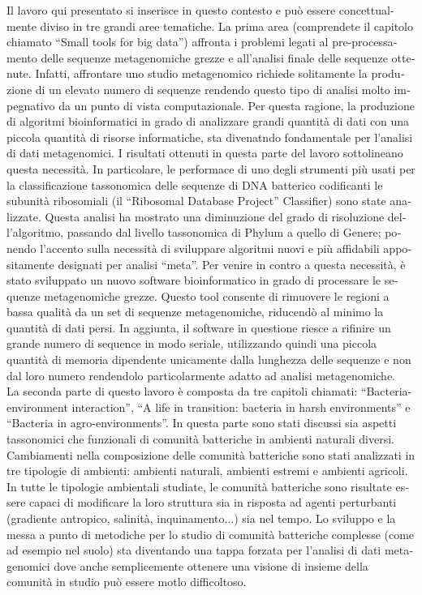 \begin{otherlanguage}{italian}
Il lavoro qui presentato si inserisce in questo contesto e può essere concettualmente diviso in tre grandi aree tematiche. La prima area (comprendete il capitolo chiamato ``Small tools for big data'')  affronta i problemi legati al pre-processamento delle sequenze metagenomiche grezze e all'analisi finale delle sequenze ottenute. Infatti, affrontare uno studio metagenomico richiede solitamente la produzione di un elevato numero di sequenze rendendo questo tipo di analisi molto impegnativo da un punto di vista computazionale. Per questa ragione, la produzione di algoritmi bioinformatici in grado di analizzare grandi quantità di dati con una piccola quantità di risorse informatiche, sta divenatndo fondamentale per l'analisi di dati metagenomici. I risultati ottenuti in questa parte del lavoro sottolineano questa necessità. In particolare, le performace di uno degli strumenti più usati per la classificazione tassonomica delle sequenze di DNA batterico codificanti le subunità ribosomiali (il ``Ribosomal Database Project'' Classifier) sono state analizzate. Questa analisi ha mostrato una diminuzione del grado di risoluzione dell'algoritmo, passando dal livello tassonomica di Phylum a quello di Genere; ponendo l'accento sulla necessità di sviluppare algoritmi nuovi e più affidabili appositamente designati per analisi ``meta''. Per venire in contro a questa necessità, è stato sviluppato un nuovo software bioinformatico in grado di processare le sequenze metagenomiche grezze. Questo tool consente di rimuovere le regioni a bassa qualità da un set di sequenze metagenomiche, riducendò al minimo la quantità di dati persi. In aggiunta, il software in questione riesce a rifinire un grande numero di sequence in modo seriale, utilizzando quindi una piccola quantità di memoria dipendente unicamente dalla lunghezza delle sequenze e non dal loro numero rendendolo particolarmente adatto ad analisi metagenomiche.\\
La seconda parte di questo lavoro è composta da tre capitoli chiamati: ``Bacteria-environment interaction'', ``A life in transition: bacteria in harsh environments'' e ``Bacteria in agro-environments''. In questa parte sono stati discussi sia aspetti tassonomici che funzionali di comunità batteriche in ambienti naturali diversi. Cambiamenti nella composizione delle comunità batteriche sono stati analizzati in tre tipologie di ambienti: ambienti naturali, ambienti estremi e ambienti agricoli. In tutte le tipologie ambientali studiate, le comunità batteriche sono risultate essere capaci di modificare la loro struttura sia in risposta ad agenti perturbanti (gradiente antropico, salinità, inquinamento...) sia nel tempo. Lo sviluppo e la messa a punto di metodiche per lo studio di comunità batteriche complesse (come ad esempio nel suolo) sta diventando una tappa forzata per l'analisi di dati metagenomici dove anche semplicemente ottenere una visione di insieme della comunità in studio può essere motlo difficoltoso.\\

\end{otherlanguage}
